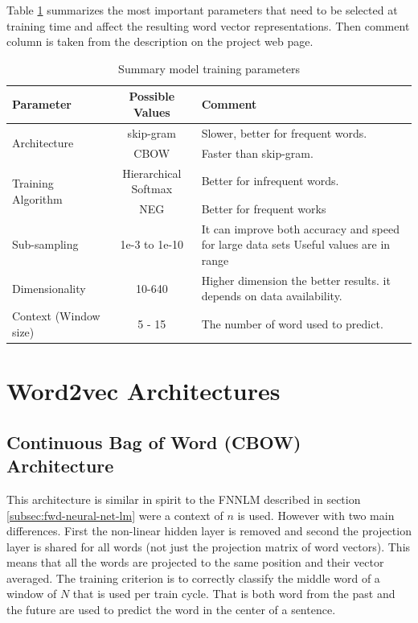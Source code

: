 Table \ref{tab:word2_vec_parameters} summarizes the most important parameters
that need to be selected at training time
and affect the resulting word vector representations. Then comment column is
taken from the description  on the project web page.


\begin{table}[h]
   \centering
   \caption{Summary model training parameters} 
   \label{tab:word2_vec_parameters}
   
   \small
   \begin{tabular}{ |l|c|p{5cm}| }
   \hline           
    Parameter &  Possible Values & Comment \\  \hline           
    \multirow{2}{*}{Architecture}  & skip-gram  & Slower, better for frequent
    words. \\ 
    \cline{2-3}
    & \ac{CBOW}  &  Faster than skip-gram. \\ \hline
    \multirow{2}{*}{Training Algorithm}  & Hierarchical Softmax  & Better for infrequent words.   \\ 
    \cline{2-3}
    & \ac{NEG} & Better for frequent works \\ \hline
    Sub-sampling  & 1e-3 to 1e-10  &  It  can improve both accuracy and speed for large data
    sets Useful values are in range \\ \hline
    Dimensionality  & 10-640 & Higher dimension the better results. 
    it depends on data availability.  \\ \hline
    Context (Window size)  & 5 - 15 & The number of word used to predict. \\ \hline

    
\end{tabular}
\end{table}


\section{Word2vec Architectures}
\label{sec:word2v-architectures}


\subsection{Continuous Bag of Word (CBOW) Architecture}

This architecture is similar in spirit to the  \ac{FNNLM} described in section
\ref{subsec:fwd-neural-net-lm} were a context of $n$ is used. However with two main differences. First the
non-linear hidden layer is removed and second the projection layer is shared for
all words (not just the projection matrix of word vectors). This means that
all the words are projected to the same position and their vector averaged.
The training criterion is to correctly classify the middle word of a window
of $N$ that is used per train cycle. That is both word from the past and the
future are used to predict the word in the center of a sentence. 


